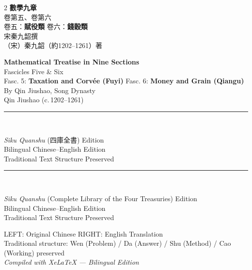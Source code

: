 \documentclass[11pt,a4paper]{article}
\begin{document}
\begin{titlepage}
\begin{paracol}{2}
{\fontsize{28}{34}\selectfont\color{titlecolor}\centering\CJKfamily{}\textbf{數學九章}\\[0.8em]}
{\fontsize{16}{20}\selectfont\color{sectioncolor}\centering 卷第五、卷第六\\[0.5em]}
{\large\color{sectioncolor}\centering 卷五：\textbf{賦役類} \textbar{} 卷六：\textbf{錢穀類}\\[2em]}
{\normalsize\centering 宋\quad 秦九韶\quad 撰\\[0.3em]}
{\small\color{sectioncolor}\centering （宋）秦九韶（約1202--1261）著\\[2em]}

\switchcolumn

{\fontsize{28}{34}\selectfont\color{titlecolor}\centering\textbf{Mathematical Treatise in Nine Sections}\\[0.8em]}
{\fontsize{16}{20}\selectfont\color{sectioncolor}\centering Fascicles Five \& Six\\[0.5em]}
{\large\color{sectioncolor}\centering Fasc.
5: \textbf{Taxation and Corv\'{e}e (Fuyi)} \textbar{} Fasc.
6: \textbf{Money and Grain (Qiangu)}\\[2em]}
{\normalsize\centering By Qin Jiushao, Song Dynasty\\[0.3em]}
{\small\color{sectioncolor}\centering Qin Jiushao (c.\,1202--1261)\\[2em]}

\switchcolumn*

\vspace{1cm}
{\color{rulecolor}\centering\rule{0.7\columnwidth}{0.4pt}\\[1.5em]}
{\small\color{sectioncolor}\centering
\textit{Siku Quanshu} (四庫全書) Edition\\[0.3em]
Bilingual Chinese--English Edition\\[0.3em]
Traditional Text Structure Preserved}

\switchcolumn

\vspace{1cm}
{\color{rulecolor}\centering\rule{0.7\columnwidth}{0.4pt}\\[1.5em]}
{\small\color{sectioncolor}\centering
\textit{Siku Quanshu} (Complete Library of the Four Treasuries) Edition\\[0.3em]
Bilingual Chinese--English Edition\\[0.3em]
Traditional Text Structure Preserved}

\end{paracol}

\vfill
\begin{center}
{\small\color{sectioncolor}
LEFT: Original Chinese \quad\textbar\quad RIGHT: English Translation\\[0.5em]
Traditional structure: Wen (Problem) / Da (Answer) / Shu (Method) / Cao (Working) preserved\\[0.5em]
\textit{Compiled with XeLaTeX --- Bilingual Edition}}
\end{center}
\end{titlepage}
\end{document}
